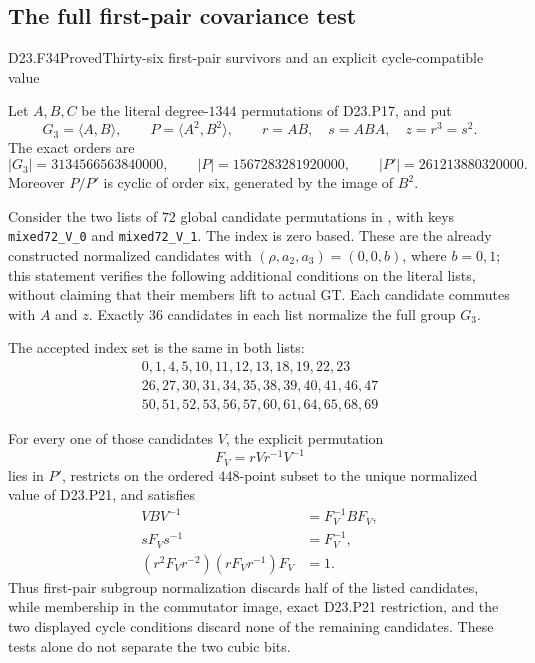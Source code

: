 \subsection{The full first-pair covariance test}

\begin{statement}{D23.F34}{Proved}{Thirty-six first-pair survivors and an explicit cycle-compatible value}
\end{statement}
Let $A,B,C$ be the literal degree-$1344$ permutations of D23.P17,
and put
\[
 G_3=\langle A,B\rangle,\qquad P=\langle A^2,B^2\rangle,
 \qquad r=AB,\quad s=ABA,\quad z=r^3=s^2.
\]
The exact orders are
\[
 |G_3|=3134566563840000,\qquad
 |P|=1567283281920000,\qquad
 |P'|=261213880320000.
\]
Moreover $P/P'$ is cyclic of order six, generated by the image of
$B^2$.

Consider the two lists of $72$ global candidate permutations in
, with keys
\texttt{mixed72\_V\_0} and \texttt{mixed72\_V\_1}.
The index is zero based. These are the already constructed normalized
candidates with $(\rho,a_2,a_3)=(0,0,b)$, where $b=0,1$;
this statement verifies the following additional conditions on the
literal lists, without claiming that their members lift to actual GT.
Each candidate commutes with $A$ and $z$. Exactly $36$ candidates in
each list normalize the full group $G_3$.

The accepted index set is the same in both lists:
\[
\begin{gathered}
 0,1,4,5,10,11,12,13,18,19,22,23\\
 26,27,30,31,34,35,38,39,40,41,46,47\\
 50,51,52,53,56,57,60,61,64,65,68,69
\end{gathered}
\]

For every one of those candidates $V$, the explicit permutation
\[
                   F_V=rVr^{-1}V^{-1}                    \tag{D23.F34.1}
\]
lies in $P'$, restricts on the ordered $448$-point subset to the
unique normalized value of D23.P21, and satisfies
\[
 \begin{split}
 V B V^{-1}&=F_V^{-1}BF_V,\\
 sF_Vs^{-1}&=F_V^{-1},\\
 (r^2F_Vr^{-2})(rF_Vr^{-1})F_V&=1.
 \end{split}                                             \tag{D23.F34.2}
\]
Thus first-pair subgroup normalization discards half of the listed
candidates, while membership in the commutator image, exact D23.P21
restriction, and the two displayed cycle conditions discard none of
the remaining candidates. These tests alone do not separate the two
cubic bits.

